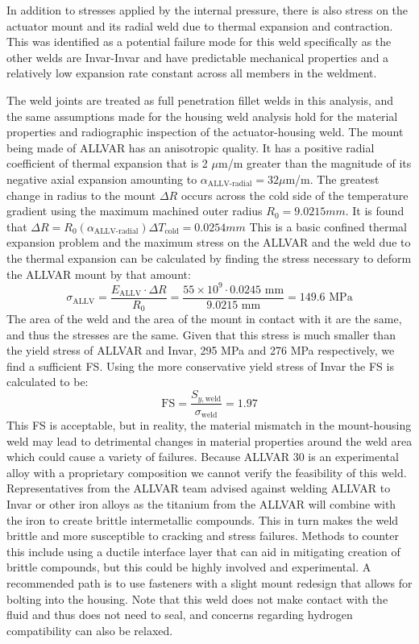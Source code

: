 \documentclass[12pt, letterpaper]{report}%
\begin{document}
		In addition to stresses applied by the internal pressure, there is also stress on the 
		actuator mount and its radial weld due to thermal expansion and contraction. This was
		identified as a potential failure mode for this weld specifically as the other welds 
		are Invar-Invar and have predictable mechanical properties and a relatively low expansion
		rate constant across all members in the weldment.

    The weld joints are treated as full penetration fillet welds in this analysis, and the same assumptions made 
		for the housing weld analysis hold for the material properties and radiographic inspection 
		of the actuator-housing weld. The mount being made of ALLVAR has an anisotropic quality. It has a positive radial coefficient
  	of thermal expansion that is 2 $\mu$m/m greater than the magnitude of its negative axial 
  	expansion amounting to $\alpha_{\text{ALLV-radial}}=32 \mu$m/m. The greatest change in radius to the mount $\Delta R$ occurs across the cold side of the 
  	temperature gradient using the maximum machined outer radius $R_0 = 9.0215 mm$. It is found that
		$\Delta R = R_0 \left(\alpha_{\text{ALLV-radial}}\right) \Delta T_{\text{cold}}=0.0254mm$
		This is a basic confined thermal expansion problem and the maximum stress on the ALLVAR and 
		the weld due to the thermal expansion can be calculated by finding the stress necessary to
		deform the ALLVAR mount by that amount:
		\begin{equation}
			\sigma_{\text{ALLV}} = \frac{E_{\text{ALLV}} \cdot \Delta R}{R_0} = \frac{55\times10^{9} \cdot 0.0245 \text{ mm}}{9.0215 \text{ mm}} = 149.6 \text{ MPa}
		\end{equation}
		The area of the weld and the area of the mount in contact with it are the same, and thus the
 		stresses are the same. Given that this stress is much smaller than the yield stress of ALLVAR and Invar,
		 295 MPa and 276 MPa respectively, we find a sufficient FS. Using the more conservative yield stress of Invar the FS is calculated to be:
		$$\text{FS} = \frac{S_{y,\text{weld}}}{\sigma_{\text{weld}}}=1.97$$
		This FS is acceptable, but in reality, the material mismatch in the mount-housing weld may lead to 
 		detrimental changes in material properties around the weld area which could cause a variety
  	of failures. Because ALLVAR 30 is an experimental alloy with a proprietary composition we 
  	cannot verify the feasibility of this weld. Representatives from the ALLVAR team advised against 
  	welding ALLVAR to Invar or other iron alloys as the titanium from the ALLVAR will combine with
   	the iron to create brittle intermetallic compounds. This in turn makes the weld brittle and more susceptible to cracking and stress failures. 
		Methods to counter this include using a ductile interface layer that can aid in mitigating 
		creation of brittle compounds, but this could be highly involved and experimental. A recommended
 		path is to use fasteners with a slight mount redesign that allows for bolting into the
  	housing. Note that this weld does not make contact with the fluid and thus does not need 
		to seal, and concerns regarding hydrogen compatibility can also be relaxed.
\end{document}
